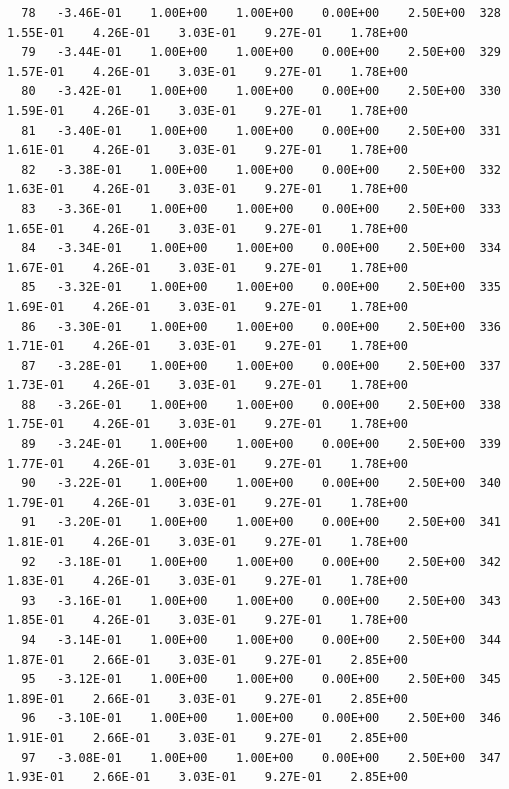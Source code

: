 \documentclass[10pt,letterpaper,notitlepage]{article}
\numberwithin{equation}{section}
\begin{document}
\begin{appendices}
{\begin{verbatim}
  78   -3.46E-01    1.00E+00    1.00E+00    0.00E+00    2.50E+00  328    1.55E-01    4.26E-01    3.03E-01    9.27E-01    1.78E+00
  79   -3.44E-01    1.00E+00    1.00E+00    0.00E+00    2.50E+00  329    1.57E-01    4.26E-01    3.03E-01    9.27E-01    1.78E+00
  80   -3.42E-01    1.00E+00    1.00E+00    0.00E+00    2.50E+00  330    1.59E-01    4.26E-01    3.03E-01    9.27E-01    1.78E+00
  81   -3.40E-01    1.00E+00    1.00E+00    0.00E+00    2.50E+00  331    1.61E-01    4.26E-01    3.03E-01    9.27E-01    1.78E+00
  82   -3.38E-01    1.00E+00    1.00E+00    0.00E+00    2.50E+00  332    1.63E-01    4.26E-01    3.03E-01    9.27E-01    1.78E+00
  83   -3.36E-01    1.00E+00    1.00E+00    0.00E+00    2.50E+00  333    1.65E-01    4.26E-01    3.03E-01    9.27E-01    1.78E+00
  84   -3.34E-01    1.00E+00    1.00E+00    0.00E+00    2.50E+00  334    1.67E-01    4.26E-01    3.03E-01    9.27E-01    1.78E+00
  85   -3.32E-01    1.00E+00    1.00E+00    0.00E+00    2.50E+00  335    1.69E-01    4.26E-01    3.03E-01    9.27E-01    1.78E+00
  86   -3.30E-01    1.00E+00    1.00E+00    0.00E+00    2.50E+00  336    1.71E-01    4.26E-01    3.03E-01    9.27E-01    1.78E+00
  87   -3.28E-01    1.00E+00    1.00E+00    0.00E+00    2.50E+00  337    1.73E-01    4.26E-01    3.03E-01    9.27E-01    1.78E+00
  88   -3.26E-01    1.00E+00    1.00E+00    0.00E+00    2.50E+00  338    1.75E-01    4.26E-01    3.03E-01    9.27E-01    1.78E+00
  89   -3.24E-01    1.00E+00    1.00E+00    0.00E+00    2.50E+00  339    1.77E-01    4.26E-01    3.03E-01    9.27E-01    1.78E+00
  90   -3.22E-01    1.00E+00    1.00E+00    0.00E+00    2.50E+00  340    1.79E-01    4.26E-01    3.03E-01    9.27E-01    1.78E+00
  91   -3.20E-01    1.00E+00    1.00E+00    0.00E+00    2.50E+00  341    1.81E-01    4.26E-01    3.03E-01    9.27E-01    1.78E+00
  92   -3.18E-01    1.00E+00    1.00E+00    0.00E+00    2.50E+00  342    1.83E-01    4.26E-01    3.03E-01    9.27E-01    1.78E+00
  93   -3.16E-01    1.00E+00    1.00E+00    0.00E+00    2.50E+00  343    1.85E-01    4.26E-01    3.03E-01    9.27E-01    1.78E+00
  94   -3.14E-01    1.00E+00    1.00E+00    0.00E+00    2.50E+00  344    1.87E-01    2.66E-01    3.03E-01    9.27E-01    2.85E+00
  95   -3.12E-01    1.00E+00    1.00E+00    0.00E+00    2.50E+00  345    1.89E-01    2.66E-01    3.03E-01    9.27E-01    2.85E+00
  96   -3.10E-01    1.00E+00    1.00E+00    0.00E+00    2.50E+00  346    1.91E-01    2.66E-01    3.03E-01    9.27E-01    2.85E+00
  97   -3.08E-01    1.00E+00    1.00E+00    0.00E+00    2.50E+00  347    1.93E-01    2.66E-01    3.03E-01    9.27E-01    2.85E+00

\end{verbatim}}
\end{appendices}
\end{document}
